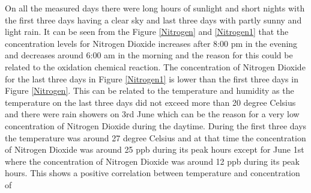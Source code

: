 On all the measured days there were long hours of sunlight and short nights with the first three days having a clear sky and last three days with partly sunny and light rain. It can be seen from the Figure \ref{Nitrogen} and \ref{Nitrogen1} that the concentration levels for Nitrogen Dioxide increases after 8:00 pm in the evening and decreases around 6:00 am in the morning and the reason for this could be related to the oxidation chemical reaction. The concentration of Nitrogen Dioxide for the last three days in Figure \ref{Nitrogen1} is lower than the first three days in Figure  \ref{Nitrogen}. This can be related to the temperature and humidity as the temperature on the last three days did not exceed more than 20 degree Celsius and there were rain showers on 3rd June which can be the reason for a very low concentration of Nitrogen Dioxide during the daytime. During the first three days the temperature was around 27 degree Celsius and at that time the concentration of Nitrogen Dioxide was around 25 ppb during its peak hours except for June 1st where the concentration of Nitrogen Dioxide was around 12 ppb during its peak hours. This shows a positive correlation between temperature and concentration of 

